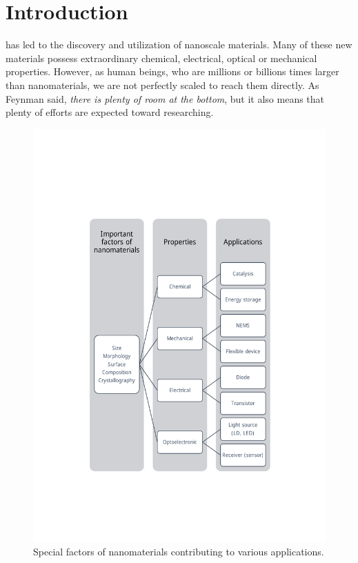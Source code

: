 

\setcounter{page}{1}

\chapter{Introduction}

 has led to the discovery and utilization of nanoscale materials. Many of these new materials possess extraordinary chemical, electrical, optical or mechanical properties. However, as human beings, who are millions or billions times larger than nanomaterials, we are not perfectly scaled to reach them directly. As Feynman said, {\it there is plenty of room at the bottom}, but it also means that plenty of efforts are expected toward researching. 

\begin{figure} 
\centering
\includegraphics[width=400pt]{figures/figure1_factors}
\caption[Factors and applications]{Special factors of nanomaterials contributing to various applications. 
\label{fig:1_factor}}
\end{figure}

